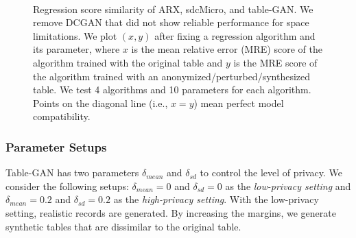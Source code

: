 \begin{figure}[t]
\\
\vspace{-1em}

\caption{Regression score similarity of ARX, sdcMicro, and table-GAN. We remove DCGAN that did not show reliable performance for space limitations. We plot $(x,y)$ after fixing a regression algorithm and its parameter, where $x$ is the mean relative error (MRE) score of the algorithm trained with the original table and $y$ is the MRE score of the algorithm trained with an anonymized\slash perturbed\slash synthesized table. We test 4 algorithms and 10 parameters for each algorithm. Points on the diagonal line (i.e., $x=y$) mean perfect model compatibility.}\label{fig:rss}
\end{figure}

\subsubsection{Parameter Setups}
Table-GAN has two parameters $\delta_{mean}$ and $\delta_{sd}$ to control the level of privacy. We consider the following setups: $\delta_{mean}=0$ and $\delta_{sd}=0$ as the \textit{low-privacy setting} and $\delta_{mean}=0.2$ and $\delta_{sd}=0.2$ as the \textit{high-privacy setting}. With the low-privacy setting, realistic records are generated. By increasing the margins, we generate synthetic tables that are dissimilar to the original table.

